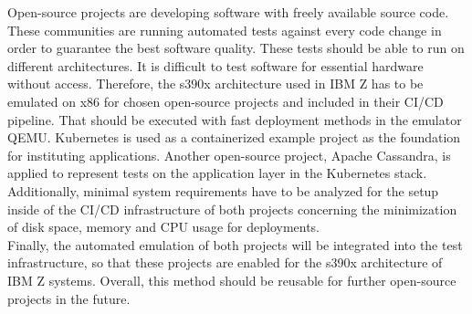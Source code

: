 Open-source projects are developing software with freely available source code. These communities are running automated tests against every code change in order to guarantee the best software quality. 
These tests should be able to run on different architectures. It is difficult to test software for essential hardware without access. Therefore, the \gls{s390x} architecture used in IBM Z has to be emulated on x86 for chosen open-source projects and included in their \gls{CI/CD} pipeline. 
That should be executed with fast deployment methods in the \gls{emulator} QEMU. 
Kubernetes is used as a \gls{containerized} example project as the foundation for instituting applications. Another open-source project, Apache Cassandra, is applied to represent tests on the \gls{application layer} in the Kubernetes stack. \\
Additionally, minimal system requirements have to be analyzed for the setup inside of the CI/CD infrastructure of both projects concerning the minimization of disk space, memory and CPU usage for deployments. \\
Finally, the automated emulation of both projects will be integrated into the test infrastructure, so that these projects are enabled for the s390x architecture of \gls{IBM Z systems}. Overall, this method should be reusable for further open-source projects in the future.


